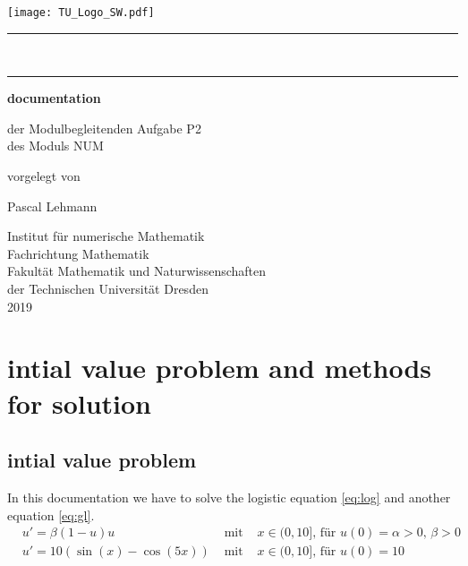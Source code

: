 \documentclass[
paper=A4,fontsize=12pt,
BCOR=15mm,DIV=22,
headinclude=true,footinclude=false,
parskip=full,
numbers=noendperiod,
ngerman,fleqn,             %
bibliography=totoc, %
toc=listof, %
cleardoublepage=empty,      %
version = last
]{scrartcl}
\begin{document}

\begin{titlepage}
	{
		\flushleft\texttt{[image: TU\_Logo\_SW.pdf]}\\[-2mm]
		\rule{\textwidth}{0.5pt}\\[-3.7mm]
		\rule{\textwidth}{0.5pt}
	}
	
	\centering\large
	{\huge\bfseries documentation}
	
	{der Modulbegleitenden Aufgabe P2\\
		des Moduls NUM
	}
	
	vorgelegt von
	
	{\Large Pascal Lehmann}
	
	Institut für numerische Mathematik\\
	Fachrichtung Mathematik\\
	Fakultät Mathematik und Naturwissenschaften\\
	der Technischen Universität Dresden\\
	2019
\end{titlepage}


\setcounter{page}{1}

\tableofcontents
\clearpage

\setcounter{page}{1}

\section{intial value problem and methods for solution}
\subsection{intial value problem}
In this documentation we have to solve the logistic equation \eqref{eq:log} and another equation \eqref{eq:gl}.
\begin{align}
\label{eq:log}
& u'=\beta (1-u)u & \text{ mit } & x\in (0,10] \text{, für }u(0)=\alpha > 0 \text{, } \beta > 0 \\
\label{eq:gl}
&u'=10(\sin(x)-\cos(5x))& \text{ mit }& x\in (0,10] \text{, für } u(0)= 10 
\end{align}
\end{document}
